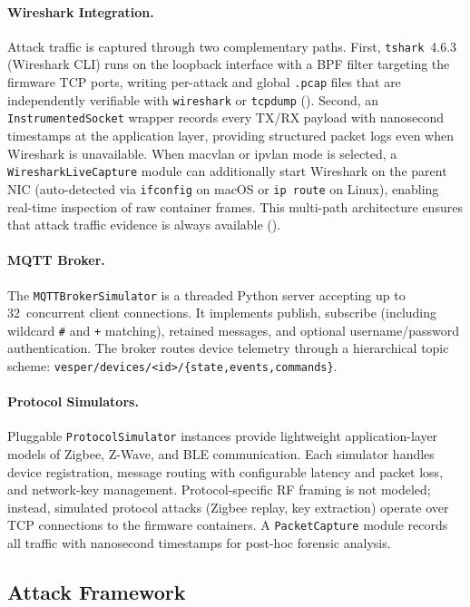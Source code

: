 \paragraph{Wireshark Integration.}
Attack traffic is captured through two complementary paths.
First, \texttt{tshark}~4.6.3 (Wireshark CLI) runs on the loopback
interface with a BPF filter targeting the firmware TCP ports,
writing per-attack and global \texttt{.pcap} files that are
independently verifiable with \texttt{wireshark} or
\texttt{tcpdump} ().
Second, an \texttt{InstrumentedSocket} wrapper records every
TX/RX payload with nanosecond timestamps at the application layer,
providing structured packet logs even when Wireshark is unavailable.
When macvlan or ipvlan mode is selected, a
\texttt{WiresharkLiveCapture} module can additionally start
Wireshark on the parent NIC (auto-detected via \texttt{ifconfig}
on macOS or \texttt{ip route} on Linux), enabling real-time
inspection of raw container frames.
This multi-path architecture ensures that attack traffic evidence
is always available ().

\paragraph{MQTT Broker.}
The \texttt{MQTTBrokerSimulator} is a threaded Python server
accepting up to 32~concurrent client connections.  It implements
publish, subscribe (including wildcard \texttt{\#} and \texttt{+}
matching), retained messages, and optional username/password
authentication.  The broker routes device telemetry through a
hierarchical topic scheme:
\texttt{vesper/devices/<id>/\{state,events,commands\}}.

\paragraph{Protocol Simulators.}
Pluggable \texttt{ProtocolSimulator} instances provide lightweight
application-layer models of Zigbee, Z-Wave, and BLE communication.
Each simulator handles device registration, message routing with
configurable latency and packet loss, and network-key management.
Protocol-specific RF framing is not modeled; instead, simulated
protocol attacks (Zigbee replay, key extraction) operate over TCP
connections to the firmware containers.  A \texttt{PacketCapture}
module records all traffic with nanosecond timestamps for post-hoc
forensic analysis.

\subsection{Attack Framework}

